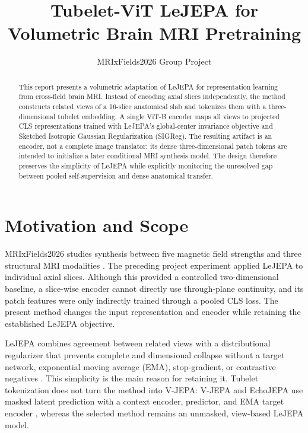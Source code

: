 \documentclass[10pt]{article}
\title{\vspace{-1.7em}\textbf{Tubelet-ViT LeJEPA for Volumetric Brain MRI Pretraining}}
\author{MRIxFields2026 Group Project}
\date{}
\begin{document}
\maketitle
\vspace{-2.2em}

\begin{abstract}
This report presents a volumetric adaptation of LeJEPA for representation
learning from cross-field brain MRI. Instead of encoding axial slices
independently, the method constructs related views of a 16-slice anatomical
slab and tokenizes them with a three-dimensional tubelet embedding. A single
ViT-B encoder maps all views to projected CLS representations trained with
LeJEPA's global-center invariance objective and Sketched Isotropic Gaussian
Regularization (SIGReg). The resulting artifact is an encoder, not a complete
image translator: its dense three-dimensional patch tokens are intended to
initialize a later conditional MRI synthesis model. The design therefore
preserves the simplicity of LeJEPA while explicitly monitoring the unresolved
gap between pooled self-supervision and dense anatomical transfer.
\end{abstract}

\section{Motivation and Scope}

MRIxFields2026 studies synthesis between five magnetic field strengths and
three structural MRI modalities \cite{mrixfields}. The preceding project
experiment applied LeJEPA to individual axial slices. Although this provided a
controlled two-dimensional baseline, a slice-wise encoder cannot directly use
through-plane continuity, and its patch features were only indirectly trained
through a pooled CLS loss. The present method changes the input representation
and encoder while retaining the established LeJEPA objective.

LeJEPA combines agreement between related views with a distributional
regularizer that prevents complete and dimensional collapse without a target
network, exponential moving average (EMA), stop-gradient, or contrastive
negatives \cite{lejepa}. This simplicity is the main reason for retaining it.
Tubelet tokenization does not turn the method into V-JEPA: V-JEPA and EchoJEPA
use masked latent prediction with a context encoder, predictor, and EMA target
encoder \cite{vjepa,echojepa}, whereas the selected method remains an
unmasked, view-based LeJEPA model.
\end{document}
